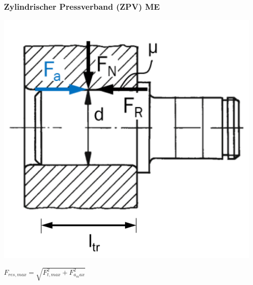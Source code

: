 \subsubsection{Zylindrischer Pressverband (ZPV) \hfill ME}
\begin{footnotesize}
    \begin{minipage}{0.3\linewidth}
        \begin{center}
            \includegraphics[width = 1.0\linewidth]{src/images/MAEIP_Zylindrischer_Pressverband}
        \end{center}
    \end{minipage}
    \begin{minipage}{0.58\linewidth}
        \begin{center}
            \scriptsize{$F_{res,max} = \sqrt{F_{t,max}^2 + F_{a_max}^2}$} 
        \end{center}
    \end{minipage}
\end{footnotesize}